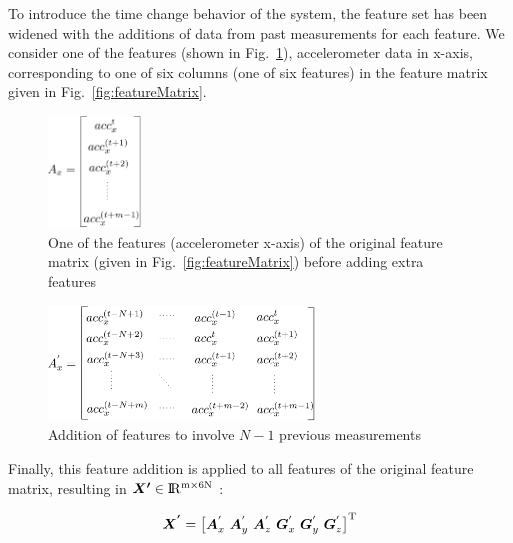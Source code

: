 To introduce the time change behavior of the system, the feature set has been widened with the additions of data from past measurements for each feature. 
We consider one of the features (shown in Fig.~\ref{fig:featureVectorNormal}), accelerometer data in x-axis, corresponding to one of six columns (one of six features) in the feature matrix given in Fig.~\ref{fig:featureMatrix}.

\begin{figure}[H]
\begin{center}
\includegraphics[width=0.22\textwidth]{figures/featureVectorNormal}    %
\caption{One of the features (accelerometer x-axis) of the original feature matrix (given in Fig.~\ref{fig:featureMatrix}) before adding extra features} 
\label{fig:featureVectorNormal}
\end{center}
\end{figure}

\begin{figure}[H]
\begin{center}
\includegraphics[width=0.63\textwidth]{figures/addingFeatures}    %
\caption{Addition of features to involve $N-1$ previous measurements} 
\label{fig:addingFeatures}
\end{center}
\end{figure}

Finally, this feature addition is applied to all features of the original feature matrix, resulting in $\bm{X'} \in {\rm I\!R^{m \times 6N}}$ :

\begin{equation}
\bm{X^{'}}= \begin{bmatrix} \bm{A}_x^{'}\ \bm{A}_y^{'} \ \bm{A}_z^{'} \ \bm{G}_x^{'} \ \bm{G}_y^{'} \ \bm{G}_z^{'}  \end{bmatrix}^{\rm T}
\end{equation}

